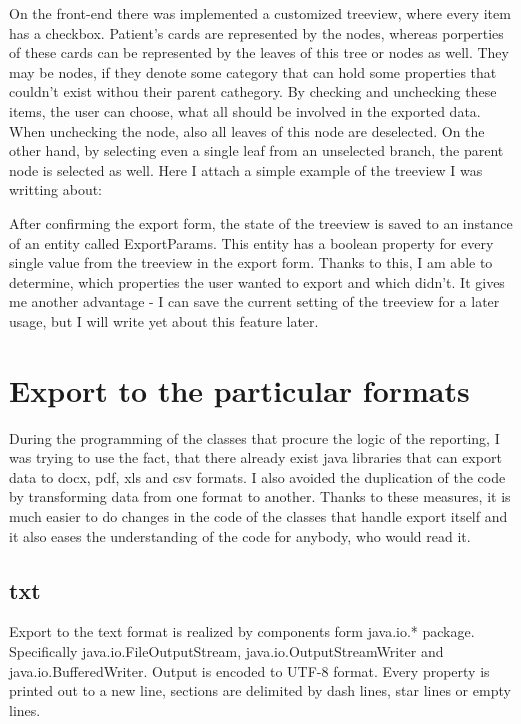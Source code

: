 \documentclass[thesis=B,english]{FITthesis}[2012/10/20]
\begin{document}
On the front-end there was implemented a customized treeview, where every item has a checkbox. Patient's cards are represented by the nodes, whereas porperties of these cards can be represented by the leaves of this tree or nodes as well. They may be nodes, if they denote some category that can hold some properties that couldn't exist withou their parent cathegory. By checking and unchecking these items, the user can choose, what all should be involved in the exported data. When unchecking the node, also all leaves of this node are deselected. On the other hand, by selecting even a single leaf from an unselected branch, the parent node is selected as well.
Here I attach a simple example of the treeview I was writting about:



After confirming the export form, the state of the treeview is saved to an instance of an entity called ExportParams. This entity has a boolean property for every single value from the treeview in the export form. Thanks to this, I am able to determine, which properties the user wanted to export and which didn't. It gives me another advantage - I can save the current setting of the treeview for a later usage, but I will write yet about this feature later.

\section{Export to the particular formats}
During the  programming of the classes that procure the logic of the reporting, I was trying to use the fact, that there already exist java libraries that can export data to docx, pdf, xls and csv formats. I also avoided the duplication of the code by transforming data from one format to another. Thanks to these measures, it is much easier to do changes in the code of the classes that handle export itself and it also eases the understanding of the code for anybody, who would read it.
\subsection{txt}
Export to the text format is realized by components form java.io.* package. Specifically java.io.FileOutputStream, java.io.OutputStreamWriter and java.io.BufferedWriter. Output is encoded to UTF-8 format. Every property is printed out to a new line, sections are delimited by dash lines, star lines or empty lines.
\end{document}
